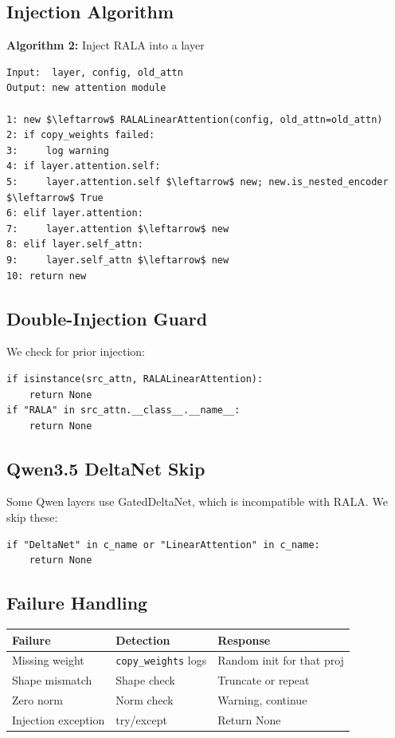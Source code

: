 \subsection{Injection Algorithm}

\textbf{Algorithm 2:} Inject RALA into a layer
\begin{lstlisting}
Input:  layer, config, old_attn
Output: new attention module

1: new $\leftarrow$ RALALinearAttention(config, old_attn=old_attn)
2: if copy_weights failed:
3:     log warning
4: if layer.attention.self:
5:     layer.attention.self $\leftarrow$ new; new.is_nested_encoder $\leftarrow$ True
6: elif layer.attention:
7:     layer.attention $\leftarrow$ new
8: elif layer.self_attn:
9:     layer.self_attn $\leftarrow$ new
10: return new
\end{lstlisting}

\subsection{Double-Injection Guard}

We check for prior injection:

\begin{lstlisting}
if isinstance(src_attn, RALALinearAttention):
    return None
if "RALA" in src_attn.__class__.__name__:
    return None
\end{lstlisting}

\subsection{Qwen3.5 DeltaNet Skip}

Some Qwen layers use GatedDeltaNet, which is incompatible with RALA. We 
skip these:

\begin{lstlisting}
if "DeltaNet" in c_name or "LinearAttention" in c_name:
    return None
\end{lstlisting}

\subsection{Failure Handling}

\begin{table}[H]
\centering
\small
\begin{tabular}{lll}
\toprule
\textbf{Failure} & \textbf{Detection} & \textbf{Response} \\
\midrule
Missing weight & \texttt{copy\_weights} logs & Random init for that proj \\
Shape mismatch & Shape check & Truncate or repeat \\
Zero norm & Norm check & Warning, continue \\
Injection exception & try/except & Return None \\
\bottomrule
\end{tabular}
\end{table}

